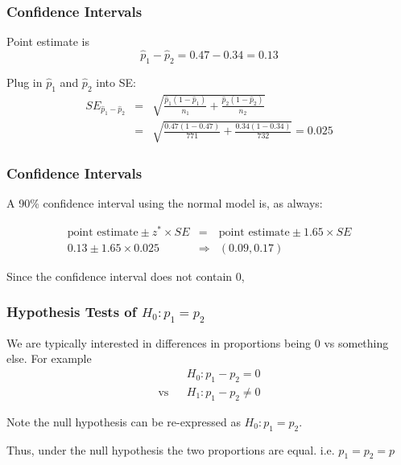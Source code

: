 \documentclass[handout]{beamer}
\newcommand{\phat}{\widehat{p}}
\begin{document}
\begin{frame}[fragile]
\frametitle{Confidence Intervals}
Point estimate is
\[
\phat_1 - \phat_2 = 0.47 - 0.34 = 0.13
\]

\pause Plug in $\phat_1$ and $\phat_2$ into SE:
\begin{eqnarray*}
SE_{\phat_1 - \phat_2} &=& 
\sqrt{\frac{\phat_1(1-\phat_1)}{n_1} + \frac{\phat_2(1-\phat_2)}{n_2}}\\
&=& \sqrt{\frac{0.47(1-0.47)}{771} + \frac{0.34(1-0.34)}{732}} = 0.025
\end{eqnarray*}

\end{frame}


\begin{frame}[fragile]
\frametitle{Confidence Intervals}

A 90\% confidence interval using the normal model is, as always:

\pause\begin{eqnarray*}
\mbox{point estimate} \pm z^* \times SE &=& \mbox{point estimate} \pm 1.65 \times SE\\
0.13 \pm 1.65 \times 0.025 &\Rightarrow& (0.09, 0.17)
\end{eqnarray*}

Since the confidence interval does not contain 0, 

\end{frame}


\begin{frame}[fragile]
\frametitle{Hypothesis Tests of $H_0: p_1=p_2$}
We are typically interested in differences in proportions being 0 vs something else.  For example
\begin{eqnarray*}
&&H_0: p_1 - p_2 = 0\\
\mbox{vs}&&H_1: p_1 - p_2 \neq 0
\end{eqnarray*}

\pause Note the null hypothesis can be re-expressed as $H_0: p_1 = p_2$.\\

\vspace{0.5cm}

\pause Thus, under the null hypothesis the two proportions are equal.  i.e. $p_1=p_2=p$

\end{frame}
\end{document}
